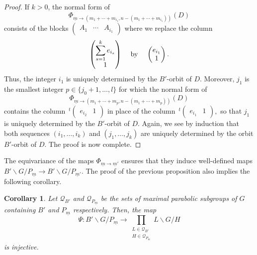 \documentclass[pdftex]{sigma}
\numberwithin{equation}{section}
\newtheorem{Corollary}[Theorem]{Corollary}
\theoremstyle{definition}
\theoremstyle{plain}
\theoremstyle{plain}
\theoremstyle{plain}
\theoremstyle{plain}
\begin{document}
\begin{proof}
	If $k > 0$, the normal form of 
	\begin{equation*}
		\Phi_{\underline m \to (m_1+\cdots+m_{i_1},n-(m_1+\cdots+m_{i_1}))}(D)
	\end{equation*}
	consists of the blocks $\begin{pmatrix}
		A_1 & \cdots & A_{i_1}
	\end{pmatrix}$
	where we replace the column 
	\begin{equation*}
	\begin{pmatrix}
		\displaystyle \sum_{s=1}^ke_{i_s} \\
		1
	\end{pmatrix} \hspace{3mm} \text{ by } \hspace{3mm} \begin{pmatrix}
		e_{i_1} \\
		1
	\end{pmatrix}.
	\end{equation*}
	Thus, the integer $i_1$ is uniquely determined by the $B'$-orbit of $D$. Moreover, $j_1$ is the smallest integer $p \in \{j_0+1,\dots,l\}$ for which the normal form of 
	\begin{equation*}
		\Phi_{\underline m \to (m_1+\cdots+m_{p},n-(m_1+\cdots+m_{p}))}(D)
	\end{equation*}
	contains the column $\,^t\begin{pmatrix}
		e_{i_2} & 1
	\end{pmatrix}$ in place of the column $\,^t\begin{pmatrix}
		e_{i_1} & 1
	\end{pmatrix},$
	so that $j_1$ is uniquely determined by the $B'$-orbit of $D$. Again, we see by induction that both sequences $(i_1,\dots,i_k)$ and $(j_1,\dots,j_k)$ are uniquely determined by the orbit $B'$-orbit of $D$. The proof is now complete.
\end{proof}

The equivariance of the maps $\Phi_{\underline m \to \underline m'}$ ensures that they induce well-defined maps $B' \backslash G/P_{\underline m} \to B' \backslash G/P_{\underline m'}$. The proof of the previous proposition also implies the following corollary.
\begin{Corollary}
	Let $\mathcal Q_{B'}$ and $\mathcal Q_{P_{\underline m}}$ be the sets of maximal parabolic subgroups of $G$ containing $B'$ and $P_{\underline m}$ respectively. Then, the map
	\begin{equation*}
		\Psi : B'\backslash G/P_{\underline m} \to \displaystyle \prod_{\substack{L \in \mathcal Q_{B'} \\ H \in \mathcal Q_{P_{\underline m}}}} L\backslash G/H
	\end{equation*}
	is injective.
\end{Corollary}
\end{document}
